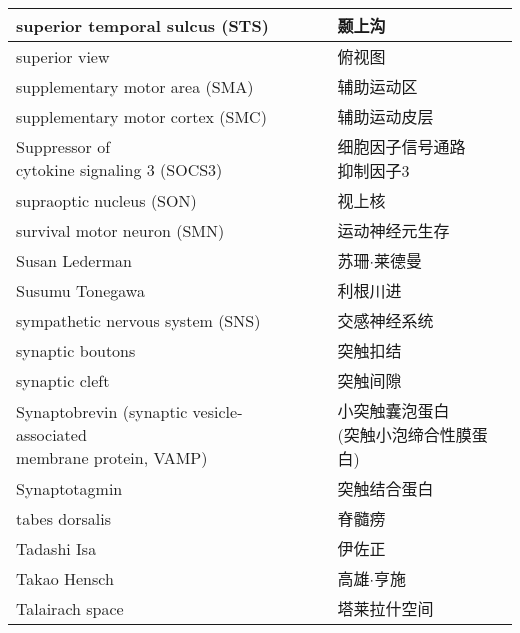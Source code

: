\begin{longtable}{lll}
	\midrule
	superior temporal sulcus (STS)   && 颞上沟 \\
	
	\midrule
	superior view   && 俯视图 \\
	
	\midrule
	supplementary motor area (SMA)   && 辅助运动区 \\
	
	\midrule
	supplementary motor cortex (SMC)   && 辅助运动皮层 \\
	
	\midrule
	\makecell[l]{Suppressor of \\cytokine signaling 3 (SOCS3)}  && \makecell[l]{细胞因子信号通路\\抑制因子3} \\
	
	\midrule
	supraoptic nucleus (SON)  && 视上核 \\
	
	\midrule
	survival motor neuron (SMN) && 运动神经元生存 \\
	
	\midrule
	Susan Lederman && 苏珊$\cdot$莱德曼 \\
	
	\midrule
	Susumu Tonegawa && 利根川进 \\
	
	\midrule
	sympathetic nervous system (SNS) && 交感神经系统 \\
	
	\midrule
	synaptic boutons && 突触扣结 \\
	
	\midrule
	synaptic cleft && 突触间隙 \\
	
	\midrule
	\makecell[l]{Synaptobrevin (synaptic vesicle-associated\\ membrane protein, VAMP)}   && \makecell[l]{小突触囊泡蛋白\\ (突触小泡缔合性膜蛋白)} \\
	
	\midrule
	Synaptotagmin   && 突触结合蛋白 \\
	
	\midrule
	tabes dorsalis   && 	脊髓痨  \\
	
	\midrule
	Tadashi Isa   && 	伊佐正  \\
	
	\midrule
	Takao Hensch   && 	高雄$\cdot$亨施  \\
	
	\midrule
	Talairach space   && 	塔莱拉什空间  \\
	

\end{longtable}
